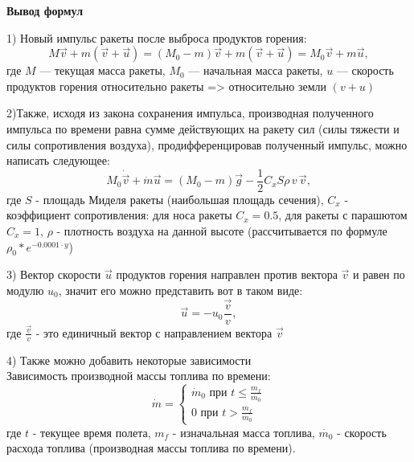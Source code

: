 \documentclass {report}
\renewcommand{\le}{\leqslant} %
\begin{document}
\begin {center}
{\Large \bf
Вывод формул
}
\end {center}

\bigskip

1) Новый импульс ракеты после выброса продуктов горения: 
\begin{equation}
M \vec{v} + m(\vec{v} + \vec{u}) = (M_0 - m) \vec{v} + m(\vec{v} + \vec{u}) = M_0\vec{v}+ m\vec{u},
\end{equation}
где $M$ --- текущая масса ракеты, $M_0$ --- начальная масса ракеты, $u$ --- скорость продуктов горения относительно ракеты => относительно земли $(v+u)$

\bigskip

2)Также, исходя из закона сохранения импульса, производная полученного импульса по времени равна сумме действующих на ракету сил (силы тяжести и силы сопротивления воздуха), продифференцировав полученный импульс, можно написать следующее: 
\begin{equation}
M_0\dot{\vec{v}} + \dot{m}\vec{u} = (M_0 - m)\vec{g} - \frac{1}{2}C_xS\rho\, v\,\vec{v},
\end{equation}
где $S$ - площадь Миделя ракеты (наибольшая площадь сечения), $C_x$ - коэффициент сопротивления: для носа ракеты $C_x=0.5$, для ракеты с парашютом $C_x=1$, $\rho$ - плотность воздуха на данной высоте (рассчитывается по формуле $\rho_0*e^{-0.0001\cdot y}$)

\bigskip

3) Вектор скорости $\vec{u}$ продуктов горения направлен против вектора $\vec{v}$ и равен по модулю $u_0$, значит его можно представить вот в таком виде:
\begin{equation}
\vec{u} = -u_0\frac{\vec{v}}{v},
\end{equation}
где $\frac{\vec{v}}{v}$ - это единичный вектор с направлением вектора $\vec{v}$

\bigskip

4) Также можно добавить некоторые зависимости \\
Зависимость производной массы топлива по времени:
\begin{equation}
\dot{m} = 
 \begin{cases}
   \dot{m}_0 \mbox{ при } t \le \frac{m_f}{\dot{m_0}} \\
   0 \mbox{ при } t > \frac{m_f}{\dot{m_0}}
 \end{cases}
\end{equation}
где $t$ - текущее время полета, $m_f$ - изначальная масса топлива, $\dot{m_0}$ - скорость расхода топлива (производная массы топлива по времени).
\end{document}
